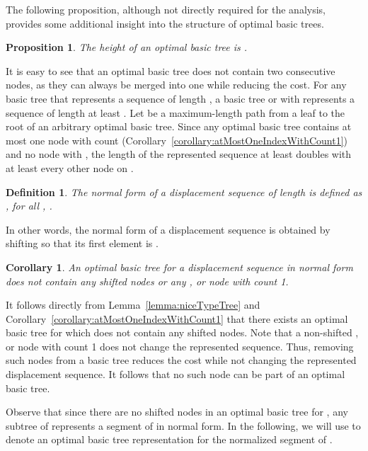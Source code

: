 \documentclass[a4paper,11pt]{article}
\newtheorem{definition}{Definition}
\newtheorem{proposition}{Proposition}
\newtheorem{corollary}{Corollary}
\newenvironment{proof}{\par\noindent{\textsc{Proof:}}\space}{\protect\\ \par}
\begin{document}
The following proposition, although not directly required for the
analysis, provides some additional insight into the structure of
optimal basic trees.

\begin{proposition}
\label{proposition:heightOfOptimalTypeTree}
The height of an optimal basic tree is .
\end{proposition}
\begin{proof}
It is easy to see that an optimal basic tree does not contain two
consecutive  nodes, as they can always be merged into one while
reducing the cost.  For any basic tree  that represents a sequence
of length , a basic tree  or
 with  represents a sequence of length at
least . Let  be a maximum-length path from a leaf to the root
of an arbitrary optimal basic tree.  Since any optimal basic tree
contains at most one  node with count 
(Corollary~\ref{corollary:atMostOneIndexWithCount1}) and no 
node with , the length of the represented sequence at least
doubles with at least every other node on .
\end{proof}

\begin{definition}
\label{def:normalForm}
The \emph{normal form}  of a displacement sequence  of
length  is defined as , for all ,
.
\end{definition}
In other words, the normal form  of a displacement sequence
 is obtained by shifting  so that its first element is .

\begin{corollary}
\label{corollary:structureOfNFSolutions}
An optimal basic tree  for a displacement sequence  in
normal form does not contain any shifted nodes or any , 
or  node with count 1.
\end{corollary}
\begin{proof}
It follows directly from Lemma~\ref{lemma:niceTypeTree} and
Corollary~\ref{corollary:atMostOneIndexWithCount1} that there exists
an optimal basic tree  for  which does not contain any
shifted nodes.  Note that a non-shifted ,  or  node
with count 1 does not change the represented sequence.  Thus, removing
such nodes from a basic tree reduces the cost while not changing the
represented displacement sequence.  It follows that no such node can
be part of an optimal basic tree.
\end{proof}

Observe that since there are no shifted nodes in an optimal basic tree
 for , any subtree of  represents a segment of
 in normal form.  In the following, we will use  to
denote an optimal basic tree representation for the normalized segment
 of .
\end{document}
